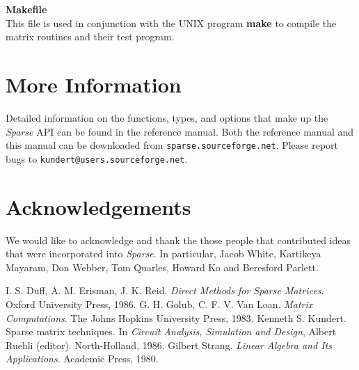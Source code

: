 \documentclass[11pt]{article}
\begin{document}
{\bf Makefile}\\
This file is used in conjunction with the UNIX program {\bf make} to
compile the matrix routines and their test program. 


\section{More Information}
Detailed information on the functions, types, and options that make up
the \emph{Sparse} API can be found in the reference manual. Both the
reference manual and this manual can be downloaded from
\verb=sparse.sourceforge.net=. Please report bugs to \verb=kundert@users.sourceforge.net=.

\section*{Acknowledgements}
We would like to acknowledge and thank the those people that
contributed ideas that were incorporated into \emph{Sparse}.  In
particular, Jacob White, Kartikeya Mayaram, Don Webber,
Tom Quarles, Howard Ko and Beresford Parlett.

\begin{thebibliography}{kundert86}
    I. S. Duff, A. M. Erisman, J. K. Reid.
    \emph{Direct Methods for Sparse Matrices}.
    Oxford University Press, 1986.
    G. H. Golub, C. F. V. Van Loan.
    \emph{Matrix Computations}.
    The Johns Hopkins University Press, 1983.
    Kenneth S. Kundert.
    Sparse matrix techniques.
    In \emph{Circuit Analysis, Simulation and Design}, Albert Ruehli (editor).
    North-Holland, 1986.
    Gilbert Strang.
    \emph{Linear Algebra and Its Applications}.
    Academic Press, 1980.
\end{thebibliography}
\end{document}
